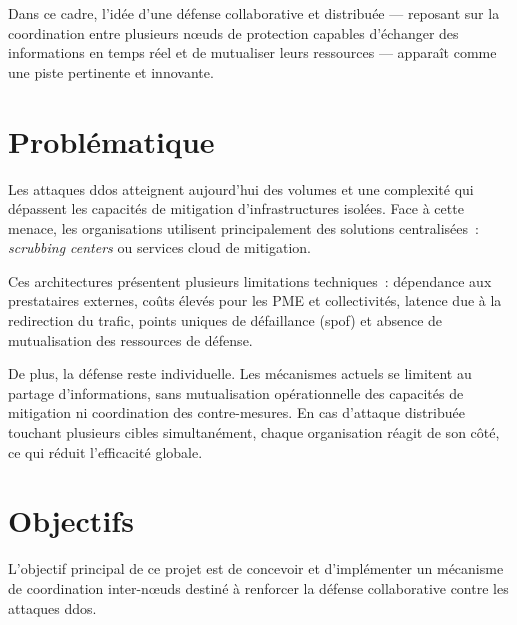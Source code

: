 Dans ce cadre, l'idée d'une défense collaborative et distribuée --- reposant sur la coordination entre plusieurs n\oe{}uds de protection capables d'échanger des informations en temps réel et de mutualiser leurs ressources --- apparaît comme une piste pertinente et innovante.


\section*{Problématique}

Les attaques \gls{ddos} atteignent aujourd'hui des volumes et une complexité qui dépassent les capacités de mitigation d'infrastructures isolées. Face à cette menace, les organisations utilisent principalement des solutions centralisées~: \textit{scrubbing centers} ou services cloud de mitigation.

Ces architectures présentent plusieurs limitations techniques~: dépendance aux prestataires externes, coûts élevés pour les PME et collectivités, latence due à la redirection du trafic, points uniques de défaillance (\gls{spof}) et absence de mutualisation des ressources de défense.

De plus, la défense reste individuelle. Les mécanismes actuels se limitent au partage d'informations, sans mutualisation opérationnelle des capacités de mitigation ni coordination des contre-mesures. En cas d'attaque distribuée touchant plusieurs cibles simultanément, chaque organisation réagit de son côté, ce qui réduit l'efficacité globale.


\section*{Objectifs}

L'objectif principal de ce projet est de concevoir et d'implémenter un mécanisme de coordination inter-n\oe{}uds destiné à renforcer la défense collaborative contre les attaques \gls{ddos}.

